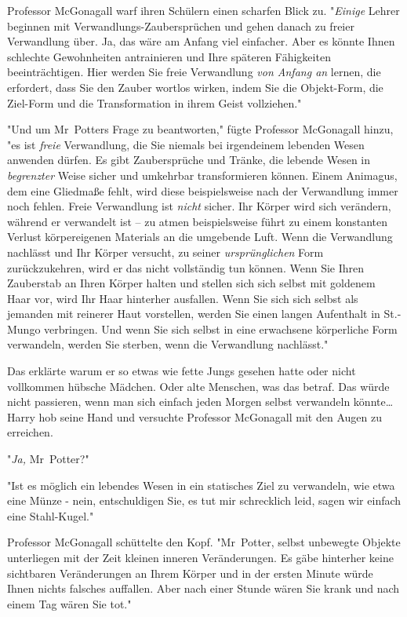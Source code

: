 {Professor McGonagall warf ihren Schülern einen scharfen Blick zu. "\emph{Einige} Lehrer beginnen mit Verwandlungs-Zaubersprüchen und gehen danach zu freier Verwandlung über. Ja, das wäre am Anfang viel einfacher. Aber es könnte Ihnen schlechte Gewohnheiten antrainieren und Ihre späteren Fähigkeiten beeinträchtigen. Hier werden Sie freie Verwandlung \emph{von Anfang an} lernen, die erfordert, dass Sie den Zauber wortlos wirken, indem Sie die Objekt-Form, die Ziel-Form und die Transformation in ihrem Geist vollziehen."

"Und um Mr~Potters Frage zu beantworten," fügte Professor McGonagall hinzu, "es ist \emph{freie} Verwandlung, die Sie niemals bei irgendeinem lebenden Wesen anwenden dürfen. Es gibt Zaubersprüche und Tränke, die lebende Wesen in \emph{begrenzter} Weise sicher und umkehrbar transformieren können. Einem Animagus, dem eine Gliedmaße fehlt, wird diese beispielsweise nach der Verwandlung immer noch fehlen. Freie Verwandlung ist \emph{nicht} sicher. Ihr Körper wird sich verändern, während er verwandelt ist -- zu atmen beispielsweise führt zu einem konstanten Verlust körpereigenen Materials an die umgebende Luft. Wenn die Verwandlung nachlässt und Ihr Körper versucht, zu seiner \emph{ursprünglichen} Form zurückzukehren, wird er das nicht vollständig tun können. Wenn Sie Ihren Zauberstab an Ihren Körper halten und stellen sich sich selbst mit goldenem Haar vor, wird Ihr Haar hinterher ausfallen. Wenn Sie sich sich selbst als jemanden mit reinerer Haut vorstellen, werden Sie einen langen Aufenthalt in St.-Mungo verbringen. Und wenn Sie sich selbst in eine erwachsene körperliche Form verwandeln, werden Sie sterben, wenn die Verwandlung nachlässt."

Das erklärte warum er so etwas wie fette Jungs gesehen hatte oder nicht vollkommen hübsche Mädchen. Oder alte Menschen, was das betraf. Das würde nicht passieren, wenn man sich einfach jeden Morgen selbst verwandeln könnte… Harry hob seine Hand und versuchte Professor McGonagall mit den Augen zu erreichen.

"\emph{Ja,} Mr~Potter?"

"Ist es möglich ein lebendes Wesen in ein statisches Ziel zu verwandeln, wie etwa eine Münze - nein, entschuldigen Sie, es tut mir schrecklich leid, sagen wir einfach eine Stahl-Kugel."

Professor McGonagall schüttelte den Kopf. "Mr~Potter, selbst unbewegte Objekte unterliegen mit der Zeit kleinen inneren Veränderungen. Es gäbe hinterher keine sichtbaren Veränderungen an Ihrem Körper und in der ersten Minute würde Ihnen nichts falsches auffallen. Aber nach einer Stunde wären Sie krank und nach einem Tag wären Sie tot."

}
